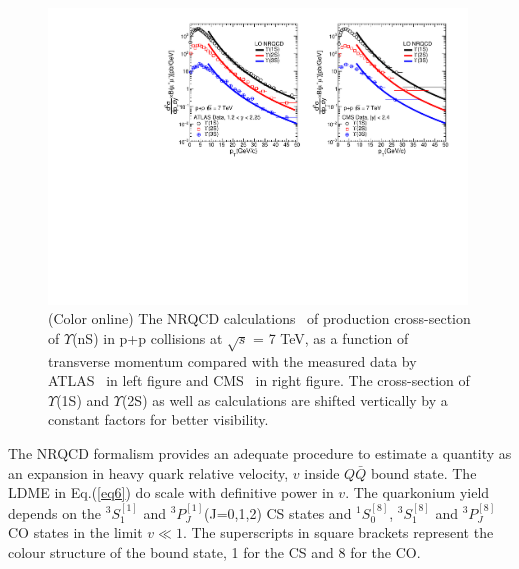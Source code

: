 \begin{figure}
  \centering
  \includegraphics[width=0.99\textwidth]{Figures/Fig4_CMS_ATLAS_YnS_7TeV_Pt.pdf}
  \caption{\small{(Color online) The NRQCD calculations~\cite{Kumar:2021sek} of production cross-section of $\Upsilon$(nS) in
      p+p collisions at $\sqrt{s}$ = 7 TeV, as a function of transverse momentum compared with
      the measured data by ATLAS~\cite{ATLAS:2012lmu} in left figure and CMS~\cite{CMS:2013qur}
      in right figure. The cross-section of $\Upsilon$(1S) and $\Upsilon$(2S) as well as
      calculations are shifted vertically by a constant factors for better visibility.}}
  \label{Fig:SigmaYnSCMS7TeV}
\end{figure}



The NRQCD formalism provides an adequate procedure to estimate a quantity as an expansion in 
heavy quark relative velocity, $v$ inside $Q\bar{Q}$ bound state. The LDME in Eq.(\ref{eq6})
do scale with definitive power in $v$. The quarkonium yield depends on the $^3S_1^{[1]}$ 
and $^3P_J^{[1]}$(J=0,1,2) CS states and $^1S_0^{[8]}$, $^3S_1^{[8]}$ and $^3P_J^{[8]}$
CO states in the limit $v\ll 1$.
The superscripts in square brackets represent the colour structure of the bound state,
1 for the CS and 8 for the CO.





